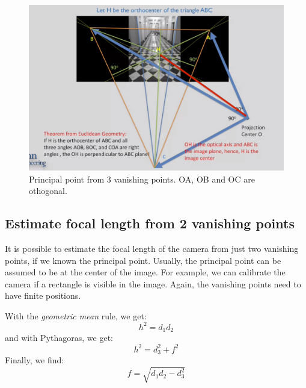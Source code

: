 \begin{figure}[H]
    \centering
    \includegraphics[width=0.94\linewidth]{content/principal_point_from_vanishing_points.png}
    \caption{Principal point from 3 vanishing points. OA, OB and OC are othogonal.}
    \label{fig:principal_point_from_vanishing_points}
\end{figure}



\subsection{Estimate focal length from 2 vanishing points}

It is possible to estimate the focal length of the camera from just two vanishing points, if we known the principal point. Usually, the principal point can be assumed to be at the center of the image. For example, we can calibrate the camera if a rectangle is visible in the image. Again, the vanishing points need to have finite positions. 

With the \textit{geometric mean} rule, we get:
\begin{equation}
     h^2 = d_1 d_2
\end{equation}
and with Pythagoras, we get: 
\begin{equation}
    h^2 = d_3^2 + f^2
\end{equation}
Finally, we find:
\begin{equation}
    f = \sqrt{d_1 d_2 - d_3^2}    
\end{equation}

